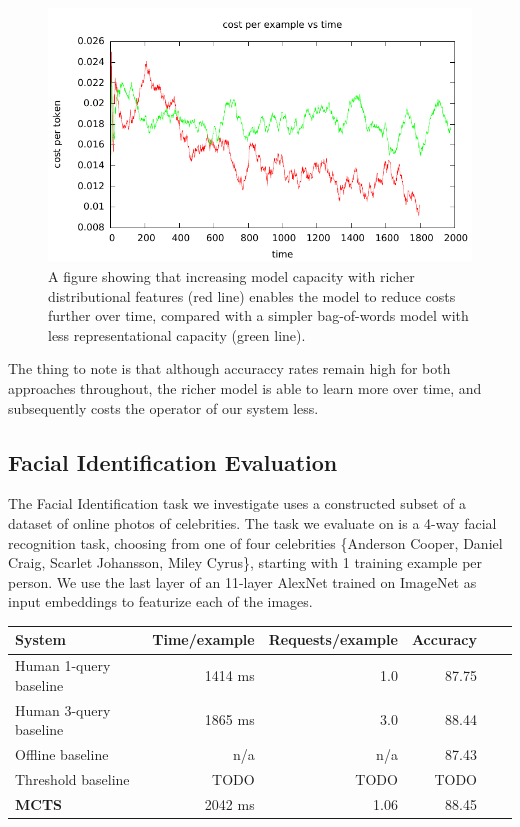 \begin{figure}[t]
  \begin{centering}
  \includegraphics[width=1.0\textwidth]{figures/sentiment_cost_per_token_vs_time/cost_per_token_vs_time.pdf}
  \end{centering}
  \caption{A figure showing that increasing model capacity with richer distributional features (red line) enables the model to reduce costs further over time, compared with a simpler bag-of-words model with less representational capacity (green line).}
\label{fig:crf}
\end{figure}

The thing to note is that although accuraccy rates remain high for both approaches throughout, the richer model is able to learn more over time, and subsequently costs the operator of our system less.

\subsection{Facial Identification Evaluation}

The Facial Identification task we investigate uses a constructed subset of a dataset of online photos of celebrities. The task we evaluate on is a 4-way facial recognition task, choosing from one of four celebrities \{Anderson Cooper, Daniel Craig, Scarlet Johansson, Miley Cyrus\}, starting with 1 training example per person. We use the last layer of an 11-layer AlexNet trained on ImageNet as input embeddings to featurize each of the images.

\begin{center}
\begin{tabular}{ | l | r | r | r | r | r | }
    \hline
    \textbf{System} & \textbf{Time/example} & \textbf{Requests/example} & \textbf{Accuracy} \\ \hline
    Human 1-query baseline & 1414 ms & 1.0 & 87.75 \\ \hline
    Human 3-query baseline & 1865 ms & 3.0 & 88.44 \\ \hline
    Offline baseline & n/a & n/a & 87.43 \\ \hline
    Threshold baseline & TODO & TODO & TODO \\ \hline
    \textbf{MCTS} & 2042 ms & 1.06 & 88.45 \\ \hline
\end{tabular}
\end{center}


